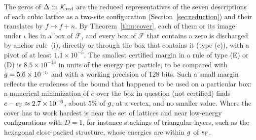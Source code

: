 \begin{remark}\label{rem:margins}
The zeros of $\Delta$ in $\mathcal K_{\mathrm{red}}$ are the reduced representatives of the seven descriptions of each cubic
lattice as a two-site configuration (Section~\ref{sec:reduction}) and their translates by $f\mapsto f+n$. By
Theorem~\ref{thm:cover}, each of them or its
image under $\iota$ lies in a box of $\mathcal F$, and every box of $\mathcal F$ that contains a zero is discharged
by anchor rule~(i), directly or through the box that contains it (type (c)), with a pivot of at least $1.1\times10^{-5}$.
The smallest certified margin in a rule of type (E) or (D) is
$8.5\times10^{-13}$ in units of the energy per particle, to be compared with $g=5.6\times10^{-5}$ and with a working
precision of $128$ bits. Such a small margin reflects the crudeness of the bound that happened to be used on a particular
box: a numerical minimization of $e$ over the box in question (not certified) finds $e-e_{\mathrm F}\approx2.7\times10^{-6}$, about
$5\%$ of $g$, at a vertex, and no smaller value. Where
the cover has to work hardest is near the set of lattices and near low-energy configurations with $D=1$, for instance stackings of
triangular layers, such as the hexagonal close-packed structure, whose energies are within $g$ of $e_{\mathrm F}$.
\end{remark}
